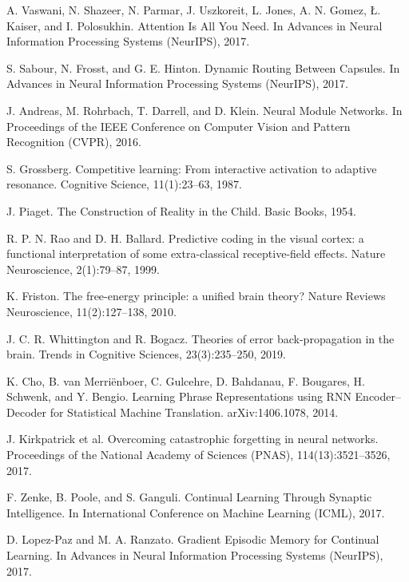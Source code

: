 \documentclass{article}
\numberwithin{figure}{section}
\numberwithin{table}{section}
\numberwithin{algorithm}{section}
\begin{document}
\begin{thebibliography}{99}

A. Vaswani, N. Shazeer, N. Parmar, J. Uszkoreit, L. Jones, A. N. Gomez, \L. Kaiser, and I. Polosukhin. Attention Is All You Need. In Advances in Neural Information Processing Systems (NeurIPS), 2017.

S. Sabour, N. Frosst, and G. E. Hinton. Dynamic Routing Between Capsules. In Advances in Neural Information Processing Systems (NeurIPS), 2017.

J. Andreas, M. Rohrbach, T. Darrell, and D. Klein. Neural Module Networks. In Proceedings of the IEEE Conference on Computer Vision and Pattern Recognition (CVPR), 2016.

S. Grossberg. Competitive learning: From interactive activation to adaptive resonance. Cognitive Science, 11(1):23--63, 1987.

J. Piaget. The Construction of Reality in the Child. Basic Books, 1954.

R. P. N. Rao and D. H. Ballard. Predictive coding in the visual cortex: a functional interpretation of some extra-classical receptive-field effects. Nature Neuroscience, 2(1):79--87, 1999.

K. Friston. The free-energy principle: a unified brain theory? Nature Reviews Neuroscience, 11(2):127--138, 2010.

J. C. R. Whittington and R. Bogacz. Theories of error back-propagation in the brain. Trends in Cognitive Sciences, 23(3):235--250, 2019.

K. Cho, B. van Merriënboer, C. Gulcehre, D. Bahdanau, F. Bougares, H. Schwenk, and Y. Bengio. Learning Phrase Representations using RNN Encoder–Decoder for Statistical Machine Translation. arXiv:1406.1078, 2014.

J. Kirkpatrick et al. Overcoming catastrophic forgetting in neural networks. Proceedings of the National Academy of Sciences (PNAS), 114(13):3521--3526, 2017.

F. Zenke, B. Poole, and S. Ganguli. Continual Learning Through Synaptic Intelligence. In International Conference on Machine Learning (ICML), 2017.

D. Lopez-Paz and M. A. Ranzato. Gradient Episodic Memory for Continual Learning. In Advances in Neural Information Processing Systems (NeurIPS), 2017.


\end{thebibliography}
\end{document}
